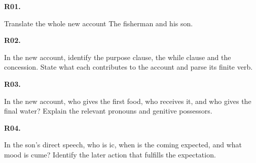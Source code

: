 \par\begin{minipage}{\linewidth}\raggedright
{}
\end{minipage}\par

\par\begin{minipage}{\linewidth}\raggedright
\textbf{R01.}

Translate the whole new account The fisherman and his son.

\end{minipage}\par\addvspace{4pt}

\par\begin{minipage}{\linewidth}\raggedright
\textbf{R02.}

In the new account, identify the purpose clause, the while clause and the concession. State what each contributes to the account and parse its finite verb.

\end{minipage}\par\addvspace{4pt}

\par\begin{minipage}{\linewidth}\raggedright
\textbf{R03.}

In the new account, who gives the first food, who receives it, and who gives the final water? Explain the relevant pronouns and genitive possessors.

\end{minipage}\par\addvspace{4pt}

\par\begin{minipage}{\linewidth}\raggedright
\textbf{R04.}

In the son’s direct speech, who is ic, when is the coming expected, and what mood is cume? Identify the later action that fulfills the expectation.

\end{minipage}\par\addvspace{4pt}

